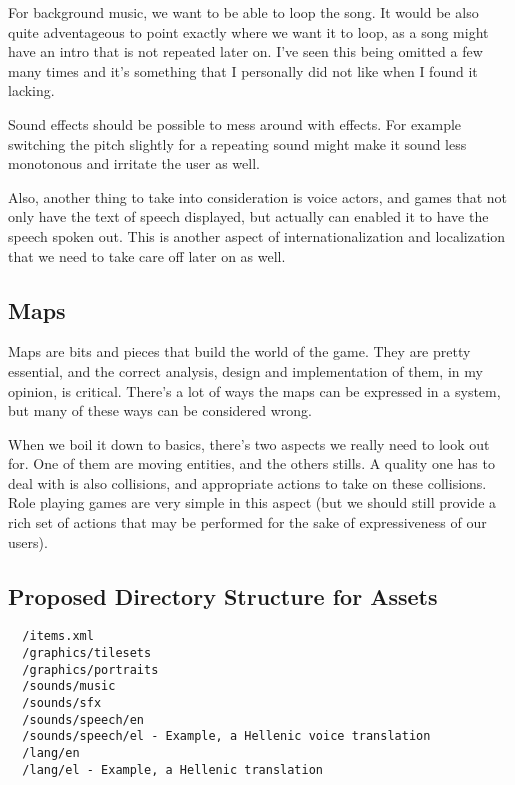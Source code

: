 For background music, we want to be able to loop the song. It would be also 
quite adventageous to point exactly where we want it to loop, as a song might
have an intro that is not repeated later on. I've seen this being omitted a few
many times and it's something that I personally did not like when I found it 
lacking.

Sound effects should be possible to mess around with effects. For example 
switching the pitch slightly for a repeating sound might make it sound less 
monotonous and irritate the user as well. 

Also, another thing to take into consideration is voice actors, and games that
not only have the text of speech displayed, but actually can enabled it to have
the speech spoken out. This is another aspect of internationalization and 
localization that we need to take care off later on as well.

\subsection{Maps}

Maps are bits and pieces that build the world of the game. They are pretty
essential, and the correct analysis, design and implementation of them, in my
opinion, is critical. There's a lot of ways the maps can be expressed in a 
system, but many of these ways can be considered wrong.

When we boil it down to basics, there's two aspects we really need to look out
for. One of them are moving entities, and the others stills. A quality one has 
to deal with is also collisions, and appropriate actions to take on these 
collisions. Role playing games are very simple in this aspect (but we should
still provide a rich set of actions that may be performed for the sake of 
expressiveness of our users).

\subsection{Proposed Directory Structure for Assets}

\begin{lstlisting}
  /items.xml
  /graphics/tilesets
  /graphics/portraits
  /sounds/music
  /sounds/sfx
  /sounds/speech/en
  /sounds/speech/el - Example, a Hellenic voice translation
  /lang/en
  /lang/el - Example, a Hellenic translation
\end{lstlisting}

